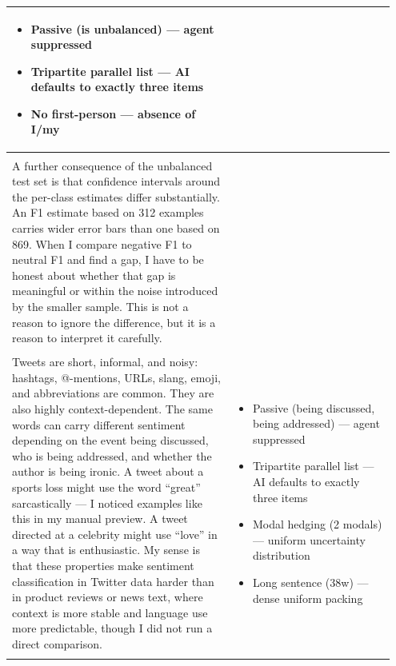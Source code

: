 \documentclass[11pt]{article}
\begin{document}
\begin{longtable}{|p{0.55\linewidth}|p{0.40\linewidth}|}
\begin{itemize}[leftmargin=1em,itemsep=1pt,topsep=1pt,parsep=0pt]
  \item Passive (is unbalanced) --- agent suppressed
  \item Tripartite parallel list --- AI defaults to exactly three items
  \item No first-person --- absence of I/my
\end{itemize} \\[2pt]
\hline
\rule[-3.5cm]{0pt}{3.5cm} & \\
\hline
A further consequence of the unbalanced test set is that confidence intervals around the per-class estimates differ substantially. An F1 estimate based on 312 examples carries wider error bars than one based on 869. When I compare negative F1 to neutral F1 and find a gap, I have to be honest about whether that gap is meaningful or within the noise introduced by the smaller sample. This is not a reason to ignore the difference, but it is a reason to interpret it carefully. &  \\[2pt]
\hline
\rule[-3.5cm]{0pt}{3.5cm} & \\
\hline
Tweets are short, informal, and noisy: hashtags, @-mentions, URLs, slang, emoji, and abbreviations are common. They are also highly context-dependent. The same words can carry different sentiment depending on the event being discussed, who is being addressed, and whether the author is being ironic. A tweet about a sports loss might use the word ``great'' sarcastically --- I noticed examples like this in my manual preview. A tweet directed at a celebrity might use ``love'' in a way that is enthusiastic. My sense is that these properties make sentiment classification in Twitter data harder than in product reviews or news text, where context is more stable and language use more predictable, though I did not run a direct comparison. & \begin{itemize}[leftmargin=1em,itemsep=1pt,topsep=1pt,parsep=0pt]
  \item Passive (being discussed, being addressed) --- agent suppressed
  \item Tripartite parallel list --- AI defaults to exactly three items
  \item Modal hedging (2 modals) --- uniform uncertainty distribution
  \item Long sentence (38w) --- dense uniform packing
\end{itemize} \\[2pt]
\hline
\rule[-3.5cm]{0pt}{3.5cm} & \\
\hline

\end{longtable}
\end{document}
